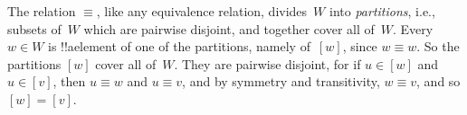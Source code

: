 \documentclass[../../../include/open-logic-section]{subfiles}
\begin{document}
The relation $\equiv$, like any equivalence relation, divides~$W$ into
\emph{partitions}, i.e., subsets of~$W$ which are pairwise disjoint,
and together cover all of~$W$. Every $w \in W$ is !!a{element} of one
of the partitions, namely of~$[w]$, since $w \equiv w$. So the
partitions $[w]$ cover all of~$W$. They are pairwise disjoint, for if
$u \in [w]$ and $u \in [v]$, then $u \equiv w$ and $u \equiv v$, and
by symmetry and transitivity, $w \equiv v$, and so $[w] = [v]$.
\end{document}
